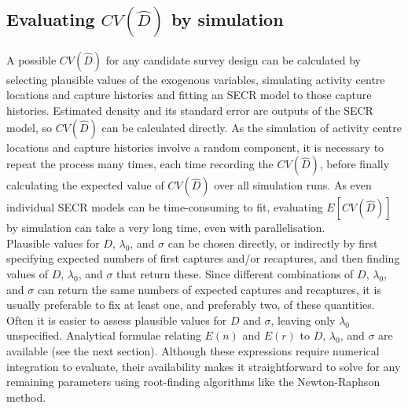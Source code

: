 \documentclass[a4paper,11pt, draft]{article} %
\begin{document}
\subsection{Evaluating $CV(\hat{D})$ by simulation} \label{s:cvsim}

A possible $CV(\hat{D})$ for any candidate survey design can be calculated by selecting plausible values of the exogenous variables, simulating activity centre locations and capture histories and fitting an SECR model to those capture histories. Estimated density and its standard error are outputs of the SECR model, so $CV(\hat{D})$ can be calculated directly. As the simulation of activity centre locations and capture histories involve a random component, it is necessary to repeat the process many times, each time recording the $CV(\hat{D})$, before finally calculating the expected value of $CV(\hat{D})$ over all simulation runs. As even individual SECR models can be time-consuming to fit, evaluating $E[CV(\hat{D})]$ by simulation can take a very long time, even with parallelisation.
\\[1em]
Plausible values for $D$, $\lambda_0$, and $\sigma$ can be chosen directly, or indirectly by first specifying expected numbers of first captures and/or recaptures, and then finding values of $D$, $\lambda_0$, and $\sigma$ that return these. Since different combinations of $D$, $\lambda_0$, and $\sigma$ can return the same numbers of expected captures and recaptures, it is usually preferable to fix at least one, and preferably two, of these quantities. Often it is easier to assess plausible values for $D$ and $\sigma$, leaving only $\lambda_0$ unspecified. Analytical formulae relating $E(n)$ and $E(r)$ to $D$, $\lambda_0$, and $\sigma$ are available (see the next section). Although these expressions require numerical integration to evaluate, their availability makes it straightforward to solve for any remaining parameters using root-finding algorithms like the Newton-Raphson method.
\\[1em]
\end{document}
